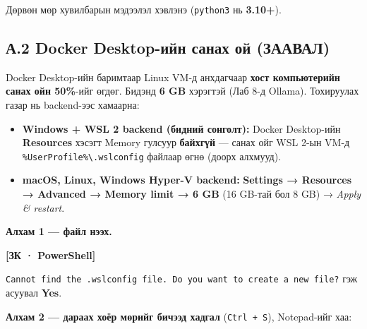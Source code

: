 Дөрвөн мөр хувилбарын мэдээлэл хэвлэнэ (\texttt{python3} нь \textbf{3.10+}).

\hypertarget{ux430.2-docker-desktop-ux438ux439ux43d-ux441ux430ux43dux430ux445-ux43eux439-ux437ux430ux430ux432ux430ux43b}{%
\subsection{А.2 Docker Desktop-ийн санах ой (ЗААВАЛ)}\label{ux430.2-docker-desktop-ux438ux439ux43d-ux441ux430ux43dux430ux445-ux43eux439-ux437ux430ux430ux432ux430ux43b}}

Docker Desktop-ийн баримтаар Linux VM-д анхдагчаар \textbf{хост компьютерийн санах ойн 50\%}-ийг өгдөг. Бидэнд \textbf{6 GB} хэрэгтэй (Лаб 8-д Ollama). Тохируулах газар нь backend-ээс хамаарна:

\begin{itemize}
\tightlist
\item
  \textbf{Windows + WSL 2 backend (бидний сонголт):} Docker Desktop-ийн \textbf{Resources} хэсэгт Memory гулсуур \textbf{байхгүй} --- санах ойг WSL 2-ын VM-д \texttt{\%UserProfile\%\textbackslash{}\allowbreak{}.\allowbreak{}wslconfig} файлаар өгнө (доорх алхмууд).
\item
  \textbf{macOS, Linux, Windows Hyper-V backend:} \textbf{Settings → Resources → Advanced → Memory limit → 6 GB} (16 GB-тай бол 8 GB) → \emph{Apply \& restart}.
\end{itemize}

\textbf{Алхам 1 --- файл нээх.}

\textbf{{[}ЗК · PowerShell{]}}

\begin{Shaded}
\begin{Highlighting}[]
\end{Highlighting}
\end{Shaded}

\texttt{Cannot\ find\ the\ .\allowbreak{}wslconfig\ file.\allowbreak{}\ Do\ you\ want\ to\ create\ a\ new\ file?\allowbreak{}} гэж асуувал \textbf{Yes}.

\textbf{Алхам 2 --- дараах хоёр мөрийг бичээд хадгал} (\texttt{Ctrl\ +\ S}), Notepad-ийг хаа:

\begin{Shaded}
\begin{Highlighting}[]
\KeywordTok{[wsl2]}
\OtherTok{=}
\end{Highlighting}
\end{Shaded}

